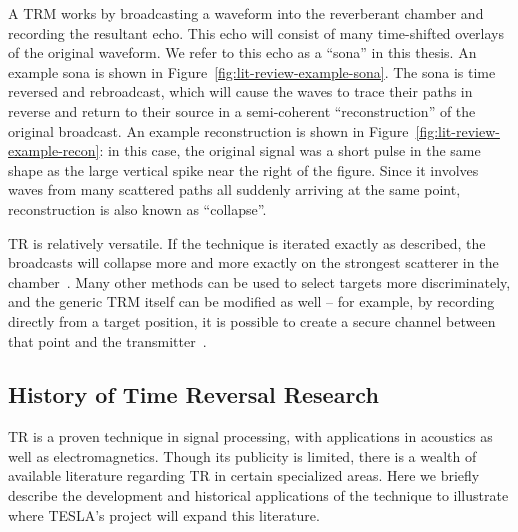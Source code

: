 A TRM works by broadcasting a waveform into the reverberant chamber and recording the resultant echo. This echo will consist of many time-shifted overlays of the original waveform. We refer to this echo as a ``sona'' in this thesis. An example sona is shown in Figure~\ref{fig:lit-review-example-sona}. The sona is time reversed and rebroadcast, which will cause the waves to trace their paths in reverse and return to their source in a semi-coherent ``reconstruction'' of the original broadcast. An example reconstruction is shown in Figure~\ref{fig:lit-review-example-recon}: in this case, the original signal was a short pulse in the same shape as the large vertical spike near the right of the figure. Since it involves waves from many scattered paths all suddenly arriving at the same point, reconstruction is also known as ``collapse''.

TR is relatively versatile. If the technique is iterated exactly as described, the broadcasts will collapse more and more exactly on the strongest scatterer in the chamber~\cite{fink_time-reversed_1999}. Many other methods can be used to select targets more discriminately, and the generic TRM itself can be modified as well -- for example, by recording directly from a target position, it is possible to create a secure channel between that point and the transmitter~\cite{nltr-wave-chaotic}.

\subsection{History of Time Reversal Research}

TR is a proven technique in signal processing, with applications in acoustics as well as electromagnetics. Though its publicity is limited, there is a wealth of available literature regarding TR in certain specialized areas. Here we briefly describe the development and historical applications of the technique to illustrate where TESLA's project will expand this literature.

